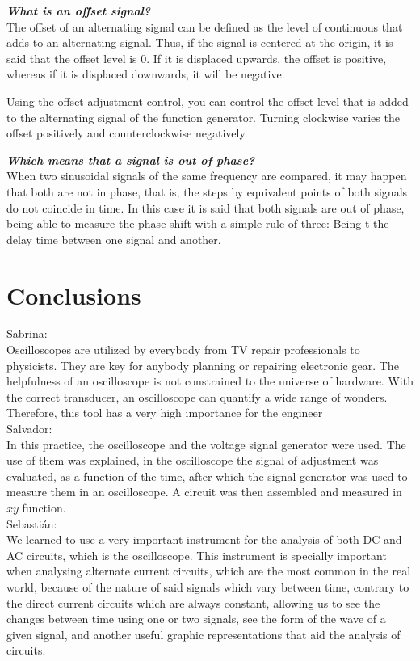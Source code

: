 \documentclass[letterpaper]{article}
\begin{document}
\textit{\textbf{What is an offset signal?}}\\
The offset of an alternating signal can be defined as the level of continuous that adds to an alternating signal. Thus, if the signal is centered at the origin, it is said that the offset level is 0. If it is displaced upwards, the offset is positive, whereas if it is displaced downwards, it will be negative.

Using the offset adjustment control, you can control the offset level that is added to the alternating signal of the function generator. Turning clockwise varies the offset positively and counterclockwise negatively.

\textit{\textbf{Which means that a signal is out of phase?}}\\
When two sinusoidal signals of the same frequency are compared, it may happen that both are not in phase, that is, the steps by equivalent points of both signals do not coincide in time. In this case it is said that both signals are out of phase, being able to measure the phase shift with a simple rule of three:
Being t the delay time between one signal and another.

\section{Conclusions}
{\large Sabrina:}\\
Oscilloscopes are utilized by everybody from TV repair professionals to physicists. They are key for
anybody planning or repairing electronic gear. The helpfulness of an oscilloscope is not constrained
to the universe of hardware. With the correct transducer, an oscilloscope can quantify a wide range
of wonders. Therefore, this tool has a very high importance for the engineer
\\[2ex]
{\large Salvador:}\\
In this practice, the oscilloscope and the voltage signal generator were used. The use of them was
explained, in the oscilloscope the signal of adjustment was evaluated, as a function of the time,
after which the signal generator was used to measure them in an oscilloscope. A circuit was then
assembled and measured in $xy$ function.
\\[2ex]
{\large Sebastián:}\\
We learned to use a very important instrument for the analysis of both DC and AC circuits, which is
the oscilloscope. This instrument is specially important when analysing alternate current circuits,
which are the most common in the real world, because of the nature of said signals which vary between
time, contrary to the direct current circuits which are always constant, allowing us to see the
changes between time using one or two signals, see the form of the wave of a given signal, and
another useful graphic representations that aid the analysis of circuits. 
\end{document}
